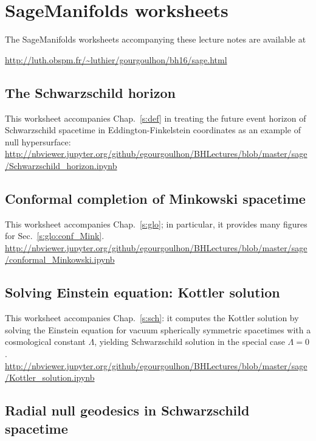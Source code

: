 \section{SageManifolds worksheets} \label{s:sam:worksheets}

The SageManifolds worksheets accompanying these lecture notes are available
at\\

\centerline{
\url{http://luth.obspm.fr/~luthier/gourgoulhon/bh16/sage.html}}

\subsection{The Schwarzschild horizon}

This worksheet accompanies Chap.~\ref{s:def} in treating the future event horizon of
Schwarzschild spacetime in Eddington-Finkelstein coordinates as an example of null hypersurface:\\[1ex]
{\footnotesize
\url{http://nbviewer.jupyter.org/github/egourgoulhon/BHLectures/blob/master/sage/Schwarzschild_horizon.ipynb}
}

\subsection{Conformal completion of Minkowski spacetime}

This worksheet accompanies Chap.~\ref{s:glo}; in particular, it provides
many figures for Sec.~\ref{s:glo:conf_Mink}.\\[1ex]
{\footnotesize
\url{http://nbviewer.jupyter.org/github/egourgoulhon/BHLectures/blob/master/sage/conformal_Minkowski.ipynb}
}

\subsection{Solving Einstein equation: Kottler solution} \label{s:sam:Kottler_solution}


This worksheet accompanies Chap.~\ref{s:sch}: it computes the Kottler solution by solving the Einstein
equation for vacuum spherically symmetric spacetimes with a cosmological constant $\Lambda$,
yielding Schwarzschild solution in the special case $\Lambda=0$. \\[1ex]
{\footnotesize
\url{http://nbviewer.jupyter.org/github/egourgoulhon/BHLectures/blob/master/sage/Kottler_solution.ipynb}
}

\subsection{Radial null geodesics in Schwarzschild spacetime}

